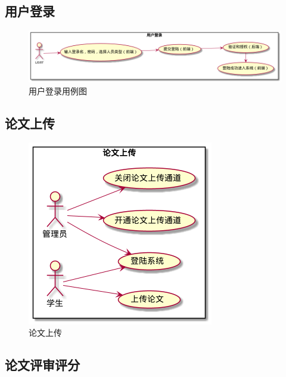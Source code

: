 \subsection{用户登录}

\begin{figure}[h]
	\centering
	\includegraphics[scale = 0.5]{out/uml/用例图/1-用户登录用例图/1-用户登录用例图.png}
	\caption{\song\wuhao 用户登录用例图}
\end{figure}

\subsection{论文上传}

\begin{figure}[h]
	\centering
	\includegraphics[scale = 0.6]{out/uml/用例图/2-论文上传/2-论文上传.png}
	\caption{\song\wuhao 论文上传}
\end{figure}

\subsection{论文评审评分}

